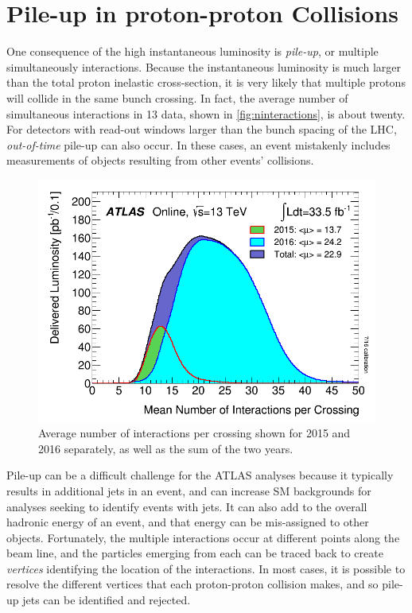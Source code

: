 \section{Pile-up in proton-proton Collisions}
\label{sec:pileup}

One consequence of the high instantaneous luminosity is \textit{pile-up}, or multiple simultaneously interactions. Because the instantaneous luminosity is much larger than the total proton inelastic cross-section, it is very likely that multiple protons will collide in the same bunch crossing. In fact, the average number of simultaneous interactions in 13 \tev data, shown in \autoref{fig:ninteractions}, is about twenty. For detectors with read-out windows larger than the bunch spacing of the \ac{LHC}, \textit{out-of-time} pile-up can also occur. In these cases, an event mistakenly includes measurements of objects resulting from other events' collisions. 

\begin{centering}
\begin{figure}[!hbt]
\myfloatalign
\includegraphics[width=.85\linewidth]{figures/lhc/mu_2015_2016_LHCC.png}
\caption{Average number of interactions per crossing shown for 2015 and 2016 separately, as well as the sum of the two years.}
\label{fig:ninteractions}
\end{figure}
\end{centering}

Pile-up can be a difficult challenge for the \ac{ATLAS} analyses because it typically results in additional jets in an event, and can increase \ac{SM} backgrounds for analyses seeking to identify events with jets. It can also add to the overall hadronic energy of an event, and that energy can be mis-assigned to other objects. Fortunately, the multiple interactions occur at different points along the beam line, and the particles emerging from each can be traced back to create \textit{vertices} identifying the location of the interactions. In most cases, it is possible to resolve the different vertices that each proton-proton collision makes, and so pile-up jets can be identified and rejected. 


